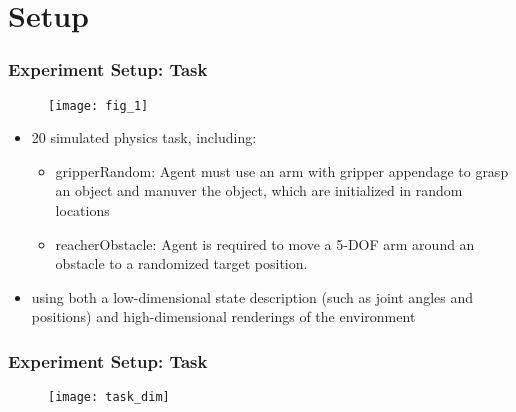 \section{Setup}

\begin{frame}
\frametitle{Experiment Setup: Task}

\begin{figure}
    \centering
    \texttt{[image: fig\_1]}
\end{figure}

\begin{itemize}
  \item 20 simulated physics task, including:
  \begin{itemize}
    \item gripperRandom:
    Agent must use an arm with gripper appendage to grasp an object and manuver the object, which
    are initialized in random locations
    \item reacherObstacle:
    Agent is required to move a 5-DOF arm around an obstacle to a randomized target position.
  \end{itemize}
  \item using both a low-dimensional state description (such as joint angles and positions) and high-dimensional renderings of the environment
\end{itemize}

\end{frame}

\begin{frame}
\frametitle{Experiment Setup: Task}

\begin{figure}
    \centering
    \texttt{[image: task\_dim]}
\end{figure}

\end{frame}



